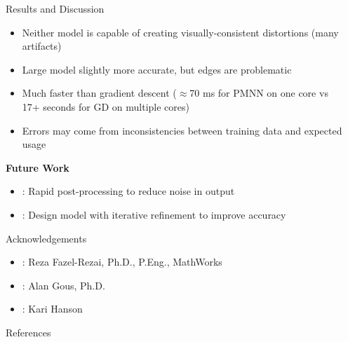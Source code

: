 \documentclass[final]{beamer}
\newlength{\sepwidth}
\newlength{\colwidth}
\newcommand{\separatorcolumn}{\begin{column}{\sepwidth}\end{column}}
\begin{document}
\begin{frame}[t]
\begin{columns}[t]
\begin{column}{\colwidth}
      \begin{block}{Results and Discussion}
        \begin{itemize}
          \item Neither model is capable of creating visually-consistent distortions (many artifacts)
          \item Large model slightly more accurate, but edges are problematic
          \item Much faster than gradient descent ($\approx$70 ms for PMNN on one core vs 17+ seconds for GD on multiple cores)
          \item Errors may come from inconsistencies between training data and expected usage
        \end{itemize}

        \textbf{Future Work}
        \begin{itemize}
          \item {}: Rapid post-processing to reduce noise in output
          \item {}: Design model with iterative refinement to improve accuracy \cite{andrychowicz_learning_2016}
        \end{itemize}

      \end{block}

      \begin{block}{Acknowledgements}
        \begin{itemize}
          \item {}: Reza Fazel-Rezai, Ph.D., P.Eng., MathWorks
          \item {}: Alan Gous, Ph.D.
          \item {}: Kari Hanson
        \end{itemize}
      \end{block}

      \begin{block}{References}

        \nocite{*}
        \footnotesize{}

      \end{block}

    \end{column}

    \separatorcolumn
  \end{columns}
\end{frame}
\end{document}

